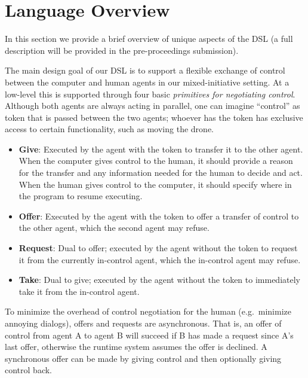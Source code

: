 \documentclass{sig-alternate-05-2015}
\begin{document}
\section{Language Overview}
\label{sec:lang}

In this section we provide a brief overview of unique aspects of the DSL (a
full description will be provided in the pre-proceedings submission).

The main design goal of our DSL is to support a flexible exchange of control
between the computer and human agents in our mixed-initiative setting. At a
low-level this is supported through four basic \emph{primitives for negotiating
control}. Although both agents are always acting in parallel, one can imagine
``control'' as token that is passed between the two agents; whoever has the
token has exclusive access to certain functionality, such as moving the drone.
%
\begin{itemize}
%
\item \textbf{Give}: Executed by the agent with the token to transfer it to the
other agent. When the computer gives control to the human, it should provide a
reason for the transfer and any information needed for the human to decide and
act. When the human gives control to the computer, it should specify where in
the program to resume executing.
%
\item \textbf{Offer}: Executed by the agent with the token to offer a transfer
of control to the other agent, which the second agent may refuse.
%
\item \textbf{Request}: Dual to offer; executed by the agent without the token
to request it from the currently in-control agent, which the in-control agent
may refuse.
%
\item \textbf{Take}: Dual to give; executed by the agent without the token to
immediately take it from the in-control agent.
%
\end{itemize}
%
To minimize the overhead of control negotiation for the human (e.g.\ minimize
annoying dialogs), offers and requests are asynchronous. That is, an offer of
control from agent A to agent B will succeed if B has made a request since A's
last offer, otherwise the runtime system assumes the offer is declined.
%
A synchronous offer can be made by giving control and then optionally giving
control back.



\iffalse
\end{document}
